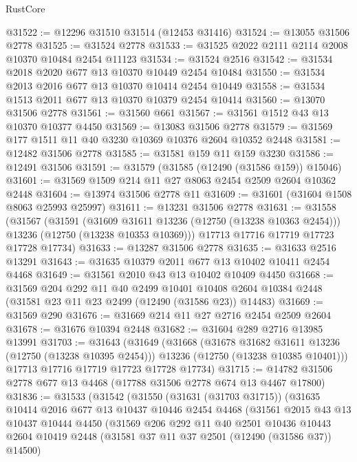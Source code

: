 \begin{lexlean}{RustCore}
\begin{coremodule}
@31522 := @12296 @31510 @31514 (@12453 @31416)
@31524 := @13055 @31506 @2778
@31525 := @31524 @2778
@31533 := @31525 @2022 @2111 @2114 @2008 @10370 @10484 @2454 @11123
@31534 := @31524 @2516
@31542 := @31534 @2018 @2020 @677 @13 @10370 @10449 @2454 @10484
@31550 := @31534 @2013 @2016 @677 @13 @10370 @10414 @2454 @10449
@31558 := @31534 @1513 @2011 @677 @13 @10370 @10379 @2454 @10414
@31560 := @13070 @31506 @2778
@31561 := @31560 @661
@31567 := @31561 @1512 @43 @13 @10370 @10377 @4450
@31569 := @13083 @31506 @2778
@31579 := @31569 @177 @1511 @11 @40 @3230 @10369 @10376 @2604 @10352 @2448
@31581 := @12482 @31506 @2778
@31585 := @31581 @159 @11 @159 @3230
@31586 := @12491 @31506
@31591 := @31579 (@31585 (@12490 (@31586 @159)) @15046)
@31601 := @31569 @1509 @214 @11 @27 @8063 @2454 @2509 @2604 @10362 @2448
@31604 := @13974 @31506 @2778 @11
@31609 := @31601 (@31604 @1508 @8063 @25993 @25997)
@31611 := @13231 @31506 @2778
@31631 := @31558
    (@31567
      (@31591
        (@31609 @31611 @13236 (@12750 (@13238 @10363 @2454)))
        @13236
        (@12750 (@13238 @10353 @10369)))
      @17713
      @17716
      @17719
      @17723
      @17728
      @17734)
@31633 := @13287 @31506 @2778
@31635 := @31633 @2516 @13291
@31643 := @31635 @10379 @2011 @677 @13 @10402 @10411 @2454 @4468
@31649 := @31561 @2010 @43 @13 @10402 @10409 @4450
@31668 := @31569
    @204
    @292
    @11
    @40
    @2499
    @10401
    @10408
    @2604
    @10384
    @2448
    (@31581 @23 @11 @23 @2499 (@12490 (@31586 @23)) @14483)
@31669 := @31569 @290
@31676 := @31669 @214 @11 @27 @2716 @2454 @2509 @2604
@31678 := @31676 @10394 @2448
@31682 := @31604 @289 @2716 @13985 @13991
@31703 := @31643
    (@31649
      (@31668
        (@31678 @31682 @31611 @13236 (@12750 (@13238 @10395 @2454)))
        @13236
        (@12750 (@13238 @10385 @10401)))
      @17713
      @17716
      @17719
      @17723
      @17728
      @17734)
@31715 := @14782 @31506 @2778 @677 @13 @4468 (@17788 @31506 @2778 @674 @13 @4467 @17800)
@31836 := @31533
    (@31542
      (@31550
        (@31631 (@31703 @31715))
        (@31635
          @10414
          @2016
          @677
          @13
          @10437
          @10446
          @2454
          @4468
          (@31561
            @2015
            @43
            @13
            @10437
            @10444
            @4450
            (@31569
              @206
              @292
              @11
              @40
              @2501
              @10436
              @10443
              @2604
              @10419
              @2448
              (@31581 @37 @11 @37 @2501 (@12490 (@31586 @37)) @14500)

\end{coremodule}
\end{lexlean}
